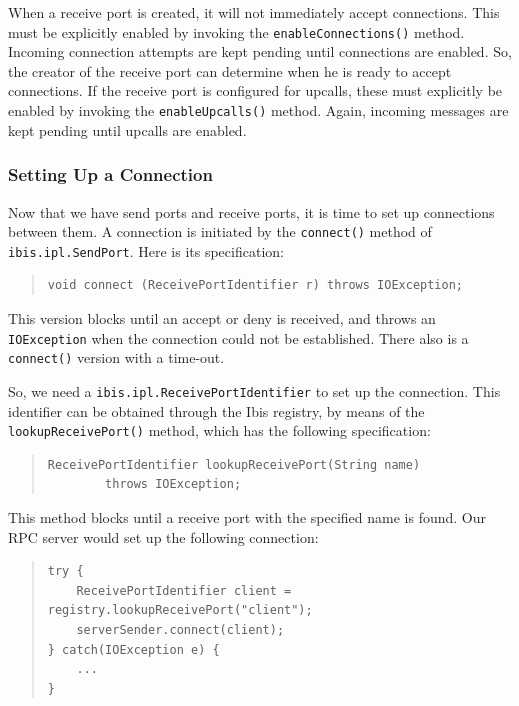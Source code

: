 \documentclass[10pt]{article}
\begin{document}
\noindent
When a receive port is created, it will not immediately accept connections.
This must be explicitly enabled by
invoking the \texttt{enableConnections()} method.
Incoming connection attempts are kept pending until connections are enabled.
So, the creator of
the receive port can determine when he is ready to accept connections.
If the receive port is configured for upcalls, these must
explicitly be enabled by invoking the \texttt{enableUpcalls()} method.
Again, incoming messages are kept pending until upcalls are enabled.

\subsubsection{Setting Up a Connection}

Now that we have send ports and receive ports, it is time to set up
connections between them.
A connection is initiated by the \texttt{connect()} method of
\texttt{ibis.ipl.SendPort}.
Here is its specification:

\begin{quote}
\begin{verbatim}
void connect (ReceivePortIdentifier r) throws IOException;
\end{verbatim}
\end{quote}

\noindent
This version blocks until an accept or deny is received, and throws
an \texttt{IOException} when the connection could not be established.
There also is a \texttt{connect()} version with a time-out.

So, we need a \texttt{ibis.ipl.ReceivePortIdentifier} to set up the
connection.
This identifier can be obtained through the Ibis registry, by
means of the \texttt{lookupReceivePort()} method, which has the following specification:

\begin{quote}
\begin{verbatim}
ReceivePortIdentifier lookupReceivePort(String name)
        throws IOException;
\end{verbatim}
\end{quote}
\noindent
This method blocks until a receive port with the specified name is found.
Our RPC server would set up the following connection:

\begin{quote}
\begin{verbatim}
try {
    ReceivePortIdentifier client = registry.lookupReceivePort("client");
    serverSender.connect(client);
} catch(IOException e) {
    ...
}
\end{verbatim}
\end{quote}
\end{document}
